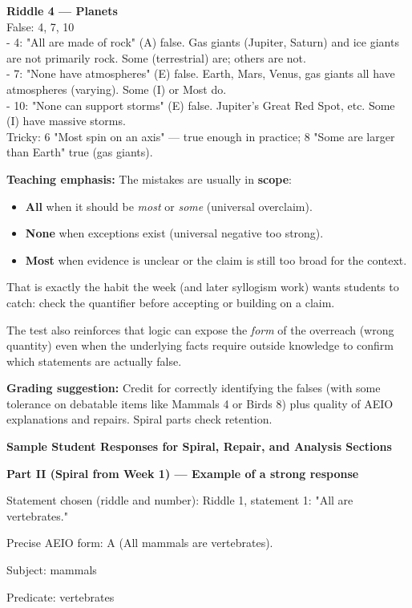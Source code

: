 \documentclass[12pt]{article}
\begin{document}
\textbf{Riddle 4 — Planets}\\
False: 4, 7, 10\\
- 4: "All are made of rock" (A) false. Gas giants (Jupiter, Saturn) and ice giants are not primarily rock. Some (terrestrial) are; others are not.\\
- 7: "None have atmospheres" (E) false. Earth, Mars, Venus, gas giants all have atmospheres (varying). Some (I) or Most do.\\
- 10: "None can support storms" (E) false. Jupiter's Great Red Spot, etc. Some (I) have massive storms.\\
Tricky: 6 "Most spin on an axis" — true enough in practice; 8 "Some are larger than Earth" true (gas giants).

\textbf{Teaching emphasis:} The mistakes are usually in \textbf{scope}:
\begin{itemize}
\item \textbf{All} when it should be \textit{most} or \textit{some} (universal overclaim).
\item \textbf{None} when exceptions exist (universal negative too strong).
\item \textbf{Most} when evidence is unclear or the claim is still too broad for the context.
\end{itemize}
That is exactly the habit the week (and later syllogism work) wants students to catch: check the quantifier before accepting or building on a claim.

The test also reinforces that logic can expose the \textit{form} of the overreach (wrong quantity) even when the underlying facts require outside knowledge to confirm which statements are actually false.

\textbf{Grading suggestion:} Credit for correctly identifying the falses (with some tolerance on debatable items like Mammals 4 or Birds 8) plus quality of AEIO explanations and repairs. Spiral parts check retention.

\textbf{Sample Student Responses for Spiral, Repair, and Analysis Sections}

\textbf{Part II (Spiral from Week 1) — Example of a strong response}

Statement chosen (riddle and number): Riddle 1, statement 1: "All are vertebrates."

Precise AEIO form: A (All mammals are vertebrates).

Subject: mammals

Predicate: vertebrates
\end{document}
